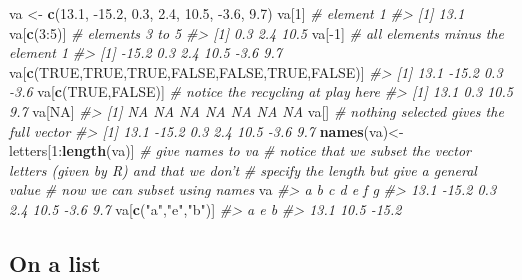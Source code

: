 \documentclass[]{book}
\newenvironment{Shaded}{}{}
\newcommand{\CommentTok}[1]{\textcolor[rgb]{0.38,0.63,0.69}{\textit{#1}}}
\newcommand{\DecValTok}[1]{\textcolor[rgb]{0.25,0.63,0.44}{#1}}
\newcommand{\FloatTok}[1]{\textcolor[rgb]{0.25,0.63,0.44}{#1}}
\newcommand{\KeywordTok}[1]{\textcolor[rgb]{0.00,0.44,0.13}{\textbf{#1}}}
\newcommand{\NormalTok}[1]{#1}
\newcommand{\OperatorTok}[1]{\textcolor[rgb]{0.40,0.40,0.40}{#1}}
\newcommand{\OtherTok}[1]{\textcolor[rgb]{0.00,0.44,0.13}{#1}}
\newcommand{\StringTok}[1]{\textcolor[rgb]{0.25,0.44,0.63}{#1}}
\theoremstyle{definition}
\theoremstyle{definition}
\theoremstyle{definition}
\theoremstyle{remark}
\begin{document}
\begin{Shaded}
\begin{Highlighting}[]
\NormalTok{va <-}\StringTok{ }\KeywordTok{c}\NormalTok{(}\FloatTok{13.1}\NormalTok{, }\FloatTok{-15.2}\NormalTok{, }\FloatTok{0.3}\NormalTok{, }\FloatTok{2.4}\NormalTok{, }\FloatTok{10.5}\NormalTok{, }\FloatTok{-3.6}\NormalTok{, }\FloatTok{9.7}\NormalTok{)}
\NormalTok{va[}\DecValTok{1}\NormalTok{] }\CommentTok{# element 1}
\CommentTok{#> [1] 13.1}
\NormalTok{va[}\KeywordTok{c}\NormalTok{(}\DecValTok{3}\OperatorTok{:}\DecValTok{5}\NormalTok{)] }\CommentTok{# elements 3 to 5}
\CommentTok{#> [1]  0.3  2.4 10.5}
\NormalTok{va[}\OperatorTok{-}\DecValTok{1}\NormalTok{] }\CommentTok{# all elements minus the element 1}
\CommentTok{#> [1] -15.2   0.3   2.4  10.5  -3.6   9.7}
\NormalTok{va[}\KeywordTok{c}\NormalTok{(}\OtherTok{TRUE}\NormalTok{,}\OtherTok{TRUE}\NormalTok{,}\OtherTok{TRUE}\NormalTok{,}\OtherTok{FALSE}\NormalTok{,}\OtherTok{FALSE}\NormalTok{,}\OtherTok{TRUE}\NormalTok{,}\OtherTok{FALSE}\NormalTok{)] }
\CommentTok{#> [1]  13.1 -15.2   0.3  -3.6}
\NormalTok{va[}\KeywordTok{c}\NormalTok{(}\OtherTok{TRUE}\NormalTok{,}\OtherTok{FALSE}\NormalTok{)] }\CommentTok{# notice the recycling at play here}
\CommentTok{#> [1] 13.1  0.3 10.5  9.7}
\NormalTok{va[}\OtherTok{NA}\NormalTok{] }
\CommentTok{#> [1] NA NA NA NA NA NA NA}
\NormalTok{va[] }\CommentTok{# nothing selected gives the full vector}
\CommentTok{#> [1]  13.1 -15.2   0.3   2.4  10.5  -3.6   9.7}
\KeywordTok{names}\NormalTok{(va)<-letters[}\DecValTok{1}\OperatorTok{:}\KeywordTok{length}\NormalTok{(va)] }\CommentTok{# give names to va}
\CommentTok{# notice that we subset the vector letters (given by R) and that we don't}
\CommentTok{# specify the length but give a general value}
\CommentTok{# now we can subset using names}
\NormalTok{va}
\CommentTok{#>     a     b     c     d     e     f     g }
\CommentTok{#>  13.1 -15.2   0.3   2.4  10.5  -3.6   9.7}
\NormalTok{va[}\KeywordTok{c}\NormalTok{(}\StringTok{"a"}\NormalTok{,}\StringTok{"e"}\NormalTok{,}\StringTok{"b"}\NormalTok{)]}
\CommentTok{#>     a     e     b }
\CommentTok{#>  13.1  10.5 -15.2}
\end{Highlighting}
\end{Shaded}

\hypertarget{on-a-list}{%
\subsection{On a list}\label{on-a-list}}
\end{document}
